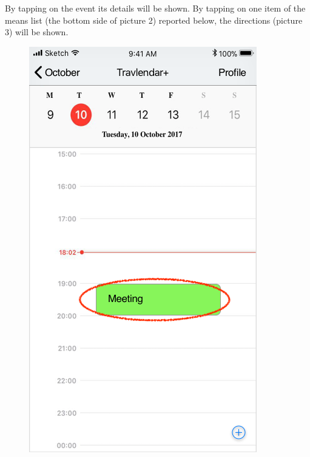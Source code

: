 By tapping on the event its details will be shown.
By tapping on one item of the means list (the bottom side of picture 2) reported below, the directions (picture 3) will be shown.
\begin{figure}[H]
	\centering
	\includegraphics[scale=0.23]{Images/Interface/Directions/1_calendar+meeting}
	\hspace{0.5cm}

\end{figure}

